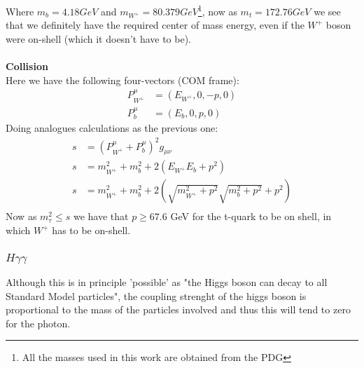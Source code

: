 \documentclass[10pt,a4paper,twoside]{article}
\begin{document}
Where $m_b = 4.18 GeV$ and $m_{W^+} = 80.379GeV$\footnote{All the masses used in this work are obtained from the PDG\cite{PDG}}, now as $m_t = 172.76 GeV$ we see that we definitely have the required center of mass energy, even if the $W^+$ boson were on-shell (which it doesn't have to be).
\\\\
\textbf{Collision}
\\
Here we have the following four-vectors (COM frame):
\begin{align}
	P^\mu_{W^+} &= (E_{W^+},0,-p,0)\\
	P^\mu_b &= (E_b,0,p,0)
\end{align}
Doing analogues calculations as the previous one:
\begin{align}
	s &= (P_{W^+}^\mu + P_b^\mu)^2g_{\mu\nu}\\
	s &= m_{W^+}^2 + m_b^2 + 2(E_{W^+}E_{b} + p^2)\\
	s &=  m_{W^+}^2 + m_b^2 + 2\left(\sqrt{m_{W^+}^2+p^2}\sqrt{m_{b}^2+p^2} + p^2\right)\\
\end{align}
Now as $m_\tau^2 \leq s$ we have that $p \geq 67.6$ GeV for the t-quark to be on shell, in which $W^+$ has to be on-shell.
\newpage
\subsubsection{$H\gamma\gamma$}
Although this is in principle 'possible' as "the Higgs boson can decay to all Standard Model particles"\cite{Thomson}, the coupling strenght of the higgs boson is proportional to the mass of the particles involved and thus this will tend to zero for the photon.
\end{document}
